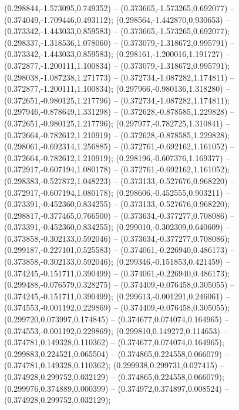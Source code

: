  (0.298844,-1.573095,0.749352) -- (0.373665,-1.573265,0.692077) -- (0.374049,-1.709446,0.493112);
 (0.298564,-1.442870,0.930653) -- (0.373342,-1.443033,0.859583) -- (0.373665,-1.573265,0.692077);
 (0.298337,-1.318536,1.078060) -- (0.373079,-1.318672,0.995791) -- (0.373342,-1.443033,0.859583);
 (0.298161,-1.200016,1.191727) -- (0.372877,-1.200111,1.100834) -- (0.373079,-1.318672,0.995791);
 (0.298038,-1.087238,1.271773) -- (0.372734,-1.087282,1.174811) -- (0.372877,-1.200111,1.100834);
 (0.297966,-0.980136,1.318280) -- (0.372651,-0.980125,1.217796) -- (0.372734,-1.087282,1.174811);
 (0.297946,-0.878649,1.331298) -- (0.372628,-0.878585,1.229828) -- (0.372651,-0.980125,1.217796);
 (0.297977,-0.782725,1.310841) -- (0.372664,-0.782612,1.210919) -- (0.372628,-0.878585,1.229828);
 (0.298061,-0.692314,1.256885) -- (0.372761,-0.692162,1.161052) -- (0.372664,-0.782612,1.210919);
 (0.298196,-0.607376,1.169377) -- (0.372917,-0.607194,1.080178) -- (0.372761,-0.692162,1.161052);
 (0.298383,-0.527872,1.048223) -- (0.373133,-0.527676,0.968220) -- (0.372917,-0.607194,1.080178);
 (0.298606,-0.452555,0.903211) -- (0.373391,-0.452360,0.834255) -- (0.373133,-0.527676,0.968220);
 (0.298817,-0.377465,0.766500) -- (0.373634,-0.377277,0.708086) -- (0.373391,-0.452360,0.834255);
 (0.299010,-0.302309,0.640609) -- (0.373858,-0.302133,0.592046) -- (0.373634,-0.377277,0.708086);
 (0.299187,-0.227101,0.525583) -- (0.374061,-0.226940,0.486173) -- (0.373858,-0.302133,0.592046);
 (0.299346,-0.151853,0.421459) -- (0.374245,-0.151711,0.390499) -- (0.374061,-0.226940,0.486173);
 (0.299488,-0.076579,0.328275) -- (0.374409,-0.076458,0.305055) -- (0.374245,-0.151711,0.390499);
 (0.299613,-0.001291,0.246061) -- (0.374553,-0.001192,0.229869) -- (0.374409,-0.076458,0.305055);
 (0.299720,0.073997,0.174845) -- (0.374677,0.074074,0.164965) -- (0.374553,-0.001192,0.229869);
 (0.299810,0.149272,0.114653) -- (0.374781,0.149328,0.110362) -- (0.374677,0.074074,0.164965);
 (0.299883,0.224521,0.065504) -- (0.374865,0.224558,0.066079) -- (0.374781,0.149328,0.110362);
 (0.299938,0.299731,0.027415) -- (0.374928,0.299752,0.032129) -- (0.374865,0.224558,0.066079);
 (0.299976,0.374889,0.000399) -- (0.374972,0.374897,0.008524) -- (0.374928,0.299752,0.032129);
